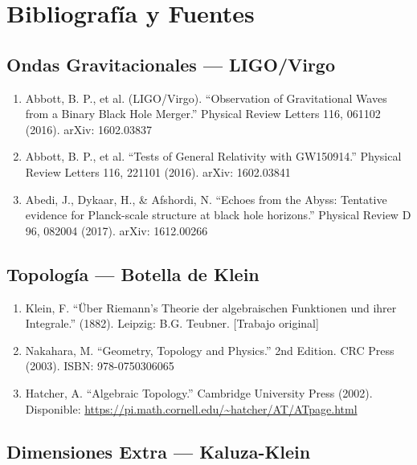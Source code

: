 \chapter{Bibliografía y Fuentes}
\label{ap:bibliografia}

\section{Ondas Gravitacionales --- LIGO/Virgo}

\begin{enumerate}
    \item Abbott, B. P., et al. (LIGO/Virgo). ``Observation of Gravitational Waves from a Binary Black Hole Merger.'' Physical Review Letters 116, 061102 (2016). arXiv: 1602.03837

    \item Abbott, B. P., et al. ``Tests of General Relativity with GW150914.'' Physical Review Letters 116, 221101 (2016). arXiv: 1602.03841

    \item Abedi, J., Dykaar, H., \& Afshordi, N. ``Echoes from the Abyss: Tentative evidence for Planck-scale structure at black hole horizons.'' Physical Review D 96, 082004 (2017). arXiv: 1612.00266
\end{enumerate}


\section{Topología --- Botella de Klein}

\begin{enumerate}
    \item Klein, F. ``Über Riemann's Theorie der algebraischen Funktionen und ihrer Integrale.'' (1882). Leipzig: B.G. Teubner. [Trabajo original]

    \item Nakahara, M. ``Geometry, Topology and Physics.'' 2nd Edition. CRC Press (2003). ISBN: 978-0750306065

    \item Hatcher, A. ``Algebraic Topology.'' Cambridge University Press (2002). Disponible: \url{https://pi.math.cornell.edu/~hatcher/AT/ATpage.html}
\end{enumerate}


\section{Dimensiones Extra --- Kaluza-Klein}

